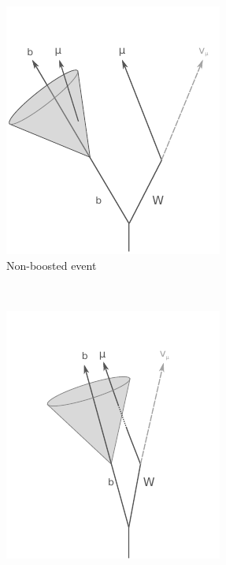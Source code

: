 \begin{figure}[t]
  \begin{subfigure}[b]{0.45\textwidth}
    \includegraphics[width=\textwidth]{PartBoosted/Plots/NonBoosted.pdf}
    \caption{Non-boosted event} \label{fig:NonBoostedDiagram}
  \end{subfigure}%
  ~ 
  \begin{subfigure}[b]{0.45\textwidth}
    \includegraphics[width=\textwidth]{PartBoosted/Plots/Boosted.pdf}

\end{subfigure}
\end{figure}
